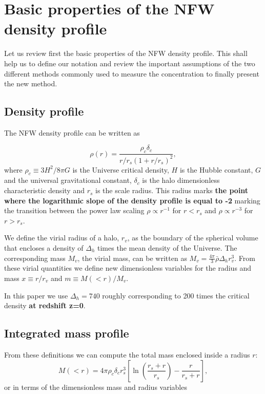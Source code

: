 \documentclass[a4,useAMS,usenatbib,usegraphicx]{mn2e}
\begin{document}
\section{Basic properties of the NFW density profile}
\label{sec:basics}

Let us review first the basic properties of the NFW density profile.
This shall help us to define our notation and review the important
assumptions of the two different methods commonly used to measure the
concentration to finally present the new method.

\subsection{Density profile}

The NFW density profile can be written as

\begin{equation}
\rho(r) = \frac{\rho_c\delta_c}{r/r_s(1+r/r_s)^2},
\label{eq:definition}
\end{equation}
%
where $\rho_c\equiv 3H^2/8\pi G$ is the Universe critical density, $H$
is the Hubble constant, $G$ and the universal gravitational constant,
$\delta_c$ is the halo dimensionless characteristic density and $r_s$
is the scale radius. This radius marks {\bf the point where the
  logarithmic slope of the density profile is equal to -2} marking the
transition between the power law scaling $\rho\propto r^{-1}$ for
$r<r_s$ and $\rho\propto r^{-3}$ for $r>r_s$.

We define the virial radius of a halo, $r_v$, as the boundary of the
spherical volume that encloses a density of $\Delta_h$ times the mean
density of the Universe.  The corresponding mass $M_{v}$, the virial
mass, can be written as $M_{v} = \frac{4\pi}{3}\bar{\rho}\Delta_h
r_v^3$.  From these virial quantities we define new dimensionless
variables for the radius and mass $x\equiv r/r_v$ and $m\equiv
M(<r)/M_v$.

In this paper we use $\Delta_h=740$ roughly corresponding to 200 times
the critical density {\bf at redshift z=0}.


\subsection{Integrated mass profile}

From these definitions we can compute the total mass enclosed inside a
radius $r$:
\begin{equation}
M(<r) = 4\pi\rho_c\delta_c  r_s^3\left[\ln \left
  (\frac{r_s+r}{r_s}\right) - \frac{r}{r_s+r}\right],
\end{equation}
%
or in terms of the dimensionless mass and radius variables
\end{document}

